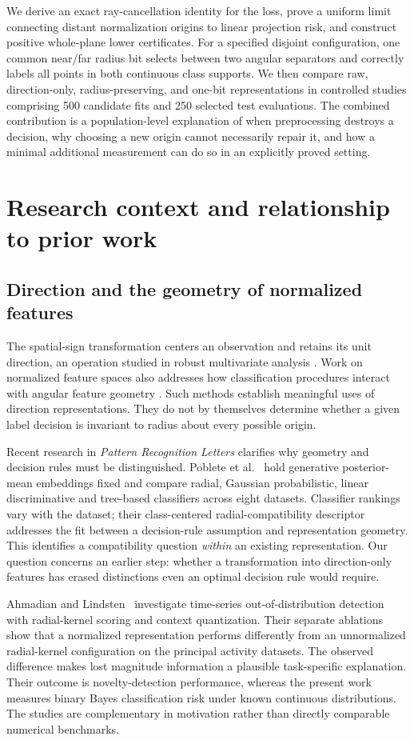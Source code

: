 \documentclass[12pt,a4paper]{article}
\begin{document}
We derive an exact ray-cancellation identity for the loss, prove a uniform limit connecting distant normalization origins to linear projection risk, and construct positive whole-plane lower certificates. For a specified disjoint configuration, one common near/far radius bit selects between two angular separators and correctly labels all points in both continuous class supports. We then compare raw, direction-only, radius-preserving, and one-bit representations in controlled studies comprising 500 candidate fits and 250 selected test evaluations. The combined contribution is a population-level explanation of when preprocessing destroys a decision, why choosing a new origin cannot necessarily repair it, and how a minimal additional measurement can do so in an explicitly proved setting.

\section{Research context and relationship to prior work}
\subsection{Direction and the geometry of normalized features}
The spatial-sign transformation centers an observation and retains its unit direction, an operation studied in robust multivariate analysis \citep{Serneels2006}. Work on normalized feature spaces also addresses how classification procedures interact with angular feature geometry \citep{Graf2003}. Such methods establish meaningful uses of direction representations. They do not by themselves determine whether a given label decision is invariant to radius about every possible origin.

Recent research in \emph{Pattern Recognition Letters} clarifies why geometry and decision rules must be distinguished. Poblete et al.~\citep{Poblete2026} hold generative posterior-mean embeddings fixed and compare radial, Gaussian probabilistic, linear discriminative and tree-based classifiers across eight datasets. Classifier rankings vary with the dataset; their class-centered radial-compatibility descriptor addresses the fit between a decision-rule assumption and representation geometry. This identifies a compatibility question \emph{within} an existing representation. Our question concerns an earlier step: whether a transformation into direction-only features has erased distinctions even an optimal decision rule would require.

Ahmadian and Lindsten~\citep{Ahmadian2025} investigate time-series out-of-distribution detection with radial-kernel scoring and context quantization. Their separate ablations show that a normalized representation performs differently from an unnormalized radial-kernel configuration on the principal activity datasets. The observed difference makes lost magnitude information a plausible task-specific explanation. Their outcome is novelty-detection performance, whereas the present work measures binary Bayes classification risk under known continuous distributions. The studies are complementary in motivation rather than directly comparable numerical benchmarks.
\end{document}
